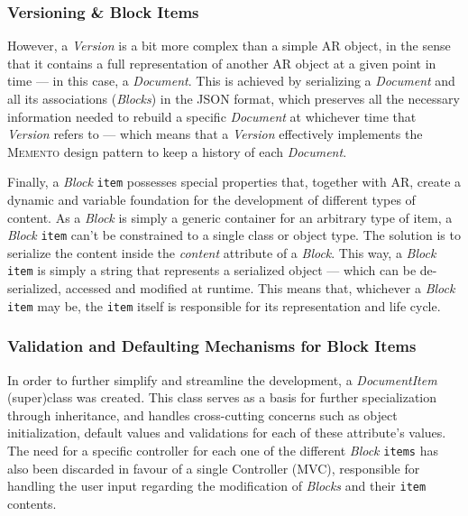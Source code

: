 \subsubsection{Versioning \& Block Items}\label{sec:fa_documents_implementation_versioning_and_block_items}

However, a \emph{Version} is a bit more complex than a simple AR object, in the sense that it contains a full representation of another AR object at a given point in time --- in this case, a \emph{Document}. This is achieved by serializing a \emph{Document} and all its associations (\emph{Blocks}) in the JSON format, which preserves all the necessary information needed to rebuild a specific \emph{Document} at whichever time that \emph{Version} refers to --- which means that a \emph{Version} effectively implements the \textsc{Memento} design pattern to keep a history of each \emph{Document}.

Finally, a \emph{Block} \texttt{item} possesses special properties that, together with AR, create a dynamic and variable foundation for the development of different types of content. As a \emph{Block} is simply a generic container for an arbitrary type of item, a \emph{Block} \texttt{item} can't be constrained to a single class or object type. The solution is to serialize the content inside the \emph{content} attribute of a \emph{Block}. This way, a \emph{Block} \texttt{item} is simply a string that represents a serialized object --- which can be de-serialized, accessed and modified at runtime. This means that, whichever a \emph{Block} \texttt{item} may be, the \texttt{item} itself is responsible for its representation and life cycle.

\subsubsection{Validation and Defaulting Mechanisms for Block Items}\label{sec:fa_documents_implementation_validation_and_defaulting_mechanisms_for_block_items}

In order to further simplify and streamline the development, a \emph{DocumentItem} (super)class was created. This class serves as a basis for further specialization through inheritance, and handles cross-cutting concerns such as object initialization, default values and validations for each of these attribute's values. The need for a specific controller for each one of the different \emph{Block} \texttt{items} has also been discarded in favour of a single Controller (MVC), responsible for handling the user input regarding the modification of \emph{Blocks} and their \texttt{item} contents.

